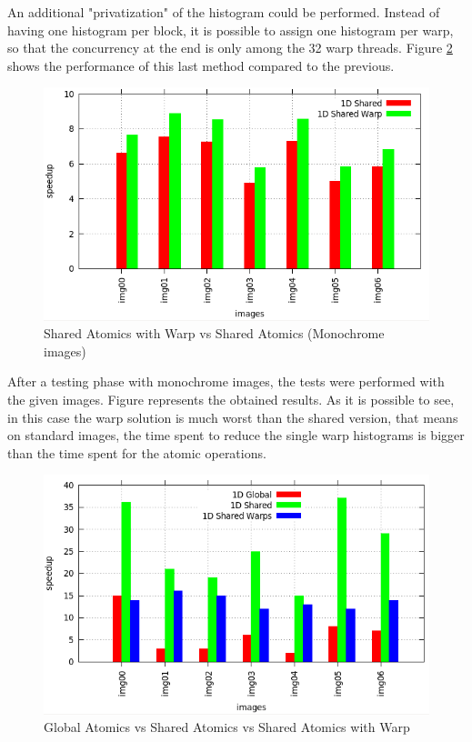 \documentclass[a4paper]{article}
\begin{document}
An additional "privatization" of the histogram could be performed. Instead of having one histogram per block, it is possible to assign one histogram per warp, so that the concurrency at the end is only among the 32 warp threads. Figure \ref{fig:sawvsa} shows the performance of this last method compared to the previous. 

\begin{figure}[!ht]
    \centering
    \includegraphics[width=0.7\linewidth]{res/new/histogram_warp}
    \caption{Shared Atomics with Warp vs Shared Atomics (Monochrome images)}
    \label{fig:sawvsa}
\end{figure}
\FloatBarrier

After a testing phase with monochrome images, the tests were performed with the given images. Figure represents the obtained results. As it is possible to see, in this case the warp solution is much worst than the shared version, that means on standard images, the time spent to reduce the single warp histograms is bigger than the time spent for the atomic operations. 

\begin{figure}[!ht]
    \centering
    \includegraphics[width=0.7\linewidth]{res/new/histogram_confronto_real}
    \caption{Global Atomics vs Shared Atomics vs Shared Atomics with Warp}
    \label{fig:sawvsa}
\end{figure}
\FloatBarrier
\end{document}
